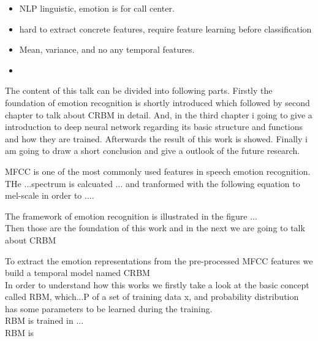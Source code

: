 \begin{frame}
\begin{itemize}
 \itemsep10pt
 \item NLP linguistic, emotion is for call center. 
 \item hard to extract concrete features, require feature learning before classification 
 \item Mean, variance, and no any temporal features.
\end{itemize}

\begin{itemize}
 \item 
\end{itemize}



\end{frame}

\begin{frame}
 The content of this talk can be divided into following parts. Firstly the foundation of emotion recognition is shortly introduced which followed by second chapter to talk about CRBM in detail. And, in the third chapter i going to give a introduction to deep neural network regarding its basic structure and functions and how they are trained. Afterwards the result of this work is showed. Finally i am going to draw a short conclusion and give a outlook of the future research. 
\end{frame}

\begin{frame}
 MFCC is one of the most commonly used features in speech emotion recognition.\\
 THe ...spectrum is calcuated ... and tranformed with the following equation to mel-scale in order to ....\\
\end{frame}


\begin{frame}
 The framework of emotion recognition is illustrated in the figure ...\\
 Then those are the foundation of this work and in the next we are going to talk about CRBM
\end{frame}


\begin{frame}
 To extract the emotion representations from the pre-processed MFCC features we build a temporal model named CRBM \\
 In order to understand how this works we firstly take a look at the basic concept called RBM, which...P of a set of training data x, and probability distribution has some parameters to be learned during the training.\\
 RBM is trained in ... \\
 RBM is 
 
\end{frame}


